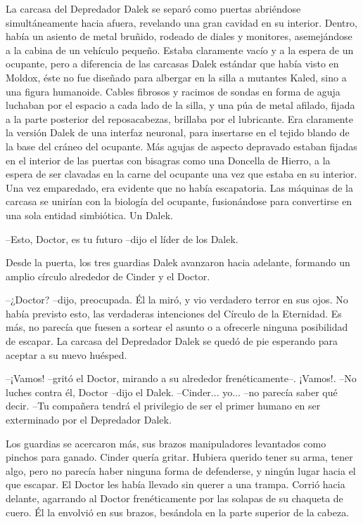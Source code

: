 La carcasa del Depredador Dalek se separó como puertas abriéndose simultáneamente hacia afuera, revelando una gran cavidad en su interior. Dentro, había un asiento de metal bruñido, rodeado de diales y monitores, asemejándose a la cabina de un vehículo pequeño. Estaba claramente vacío y a la espera de un ocupante, pero a diferencia de las carcasas Dalek estándar que había visto en Moldox, éste no fue diseñado para albergar en la silla a mutantes Kaled, sino a una figura humanoide.
Cables fibrosos y racimos de sondas en forma de aguja luchaban por el espacio a cada lado de la silla, y una púa de metal afilado, fijada a la parte posterior del reposacabezas, brillaba por el lubricante. Era claramente la versión Dalek de una interfaz neuronal, para insertarse en el tejido blando de la base del cráneo del ocupante.
Más agujas de aspecto depravado estaban fijadas en el interior de las puertas con bisagras como una Doncella de Hierro, a la espera de ser clavadas en la carne del ocupante una vez que estaba en su interior.
Una vez emparedado, era evidente que no había escapatoria. Las máquinas de la carcasa se unirían con la biología del ocupante, fusionándose para convertirse en una sola entidad simbiótica. Un Dalek.

--Esto, Doctor, es tu futuro --dijo el líder de los Dalek.

Desde la puerta, los tres guardias Dalek avanzaron hacia adelante, formando un amplio círculo alrededor de Cinder y el Doctor.

--¿Doctor? --dijo, preocupada. Él la miró, y vio verdadero terror en sus ojos. No había previsto esto, las verdaderas intenciones del Círculo de la Eternidad. Es más, no parecía que fuesen a sortear el asunto o a ofrecerle ninguna posibilidad de escapar. La carcasa del Depredador Dalek se quedó de pie esperando para aceptar a su nuevo huésped.

--¡Vamos! --gritó el Doctor, mirando a su alrededor frenéticamente--. ¡Vamos!.
--No luches contra él, Doctor --dijo el Dalek.
--Cinder... yo... --no parecía saber qué decir.
--Tu compañera tendrá el privilegio de ser el primer humano en ser exterminado por el Depredador Dalek.

Los guardias se acercaron más, sus brazos manipuladores levantados como pinchos para ganado. Cinder quería gritar. Hubiera querido tener su arma, tener algo, pero no parecía haber ninguna forma de defenderse, y ningún lugar hacia el que escapar. El Doctor les había llevado sin querer a una trampa.
Corrió hacia delante, agarrando al Doctor frenéticamente por las solapas de su chaqueta de cuero. Él la envolvió en sus brazos, besándola en la parte superior de la cabeza. 

